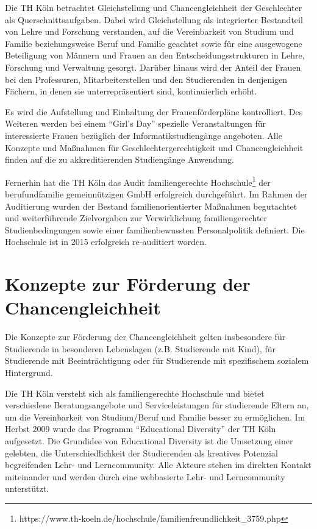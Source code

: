 Die TH Köln betrachtet Gleichstellung und Chancengleichheit der
Geschlechter als Querschnittsaufgaben. Dabei wird Gleichstellung als
integrierter Bestandteil von Lehre und Forschung verstanden, auf die
Vereinbarkeit von Studium und Familie beziehungsweise Beruf und Familie
geachtet sowie für eine ausgewogene Beteiligung von Männern und Frauen
an den Entscheidungsstrukturen in Lehre, Forschung und Verwaltung
gesorgt. Darüber hinaus wird der Anteil der Frauen bei den Professuren,
Mitarbeiterstellen und den Studierenden in denjenigen Fächern, in denen
sie unterrepräsentiert sind, kontinuierlich erhöht.

Es wird die Aufstellung und Einhaltung der Frauenförderpläne
kontrolliert. Des Weiteren werden bei einem ``Girl's Day'' spezielle
Veranstaltungen für interessierte Frauen bezüglich der
Informatikstudiengänge angeboten. Alle Konzepte und Maßnahmen für
Geschlechtergerechtigkeit und Chancengleichheit finden auf die zu
akkreditierenden Studiengänge Anwendung.

Fernerhin hat die TH Köln das Audit familiengerechte
Hochschule\footnote{https://www.th-koeln.de/hochschule/familienfreundlichkeit\_3759.php}
der berufundfamilie gemeinnützigen GmbH erfolgreich durchgeführt. Im
Rahmen der Auditierung wurden der Bestand familienorientierter Maßnahmen
begutachtet und weiterführende Zielvorgaben zur Verwirklichung
familiengerechter Studienbedingungen sowie einer familienbewussten
Personalpolitik definiert. Die Hochschule ist in 2015 erfolgreich
re-auditiert worden.

\section{Konzepte zur Förderung der
Chancengleichheit}\label{konzepte-zur-fuxf6rderung-der-chancengleichheit}

Die Konzepte zur Förderung der Chancengleichheit gelten insbesondere für
Studierende in besonderen Lebenslagen (z.B. Studierende mit Kind), für
Studierende mit Beeinträchtigung oder für Studierende mit spezifischem
sozialem Hintergrund.

Die TH Köln versteht sich als familiengerechte Hochschule und bietet
verschiedene Beratungsangebote und Serviceleistungen für studierende
Eltern an, um die Vereinbarkeit von Studium/Beruf und Familie besser zu
ermöglichen. Im Herbst 2009 wurde das Programm ``Educational Diversity''
der TH Köln aufgesetzt. Die Grundidee von Educational Diversity ist die
Umsetzung einer gelebten, die Unterschiedlichkeit der Studierenden als
kreatives Potenzial begreifenden Lehr- und Lerncommunity. Alle Akteure
stehen im direkten Kontakt miteinander und werden durch eine webbasierte
Lehr- und Lerncommunity unterstützt.

